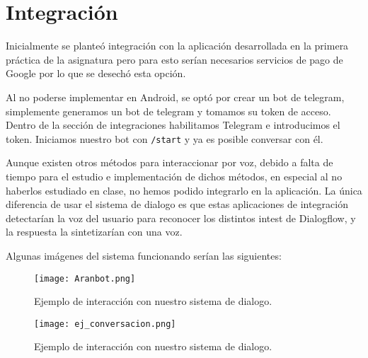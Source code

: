 \section{Integración}

Inicialmente se planteó integración con la aplicación desarrollada en la primera práctica de la asignatura pero para esto serían necesarios servicios de pago de Google por lo que se desechó esta opción.

Al no poderse implementar en Android, se optó por crear un bot de telegram, simplemente generamos un bot de telegram y tomamos su token de acceso. Dentro de la sección de integraciones habilitamos Telegram e introducimos el token. Iniciamos nuestro bot con \texttt{/start} y ya es posible conversar con él.

Aunque existen otros métodos para interaccionar por voz, debido a falta de tiempo para el estudio e implementación de dichos métodos, en especial al no haberlos estudiado en clase, no hemos podido integrarlo en la aplicación. La única diferencia de usar el sistema de dialogo es que estas aplicaciones de integración detectarían la voz del usuario para reconocer los distintos intest de Dialogflow, y la respuesta la sintetizarían con una voz.

Algunas imágenes del sistema funcionando serían las siguientes:

\begin{figure}[H]
  \centering
      \texttt{[image: Aranbot.png]}
 		\caption{Ejemplo de interacción con nuestro sistema de dialogo.}
\end{figure}


\begin{figure}[H]
  \centering
      \texttt{[image: ej\_conversacion.png]}
 		\caption{Ejemplo de interacción con nuestro sistema de dialogo.}
\end{figure}

